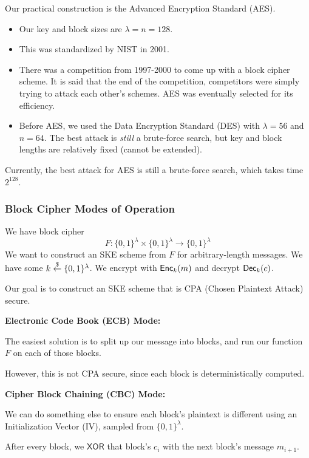 Our practical construction is the Advanced Encryption Standard (AES).
\begin{itemize}
    \item Our key and block sizes are $\lambda = n = 128$.
    \item This was standardized by NIST in 2001.
    \item There was a competition from 1997-2000 to come up with a block cipher scheme. It is said that the end of the competition, competitors were simply trying to attack each other's schemes. AES was eventually selected for its efficiency.
    \item Before AES, we used the Data Encryption Standard (DES) with $\lambda = 56$ and $n = 64$. The best attack is \emph{still} a brute-force search, but key and block lengths are relatively fixed (cannot be extended).
\end{itemize}

Currently, the best attack for AES is still a brute-force search, which takes time $2^{128}$.

\subsubsection{Block Cipher Modes of Operation}
We have block cipher
\[F : \{0, 1\}^\lambda\times \{0, 1\}^\lambda\to \{0, 1\}^\lambda\]
We want to construct an SKE scheme from $F$ for arbitrary-length messages. We have some $k\overset{\$}{\leftarrow}\{0, 1\}^\lambda$. We encrypt with $\operatorname{\mathsf{Enc}}_k(m)$ and decrypt $\operatorname{\mathsf{Dec}}_k(c)$.

Our goal is to construct an SKE scheme that is CPA (Chosen Plaintext Attack) secure.

\textbf{Electronic Code Book (ECB) Mode:}

The easiest solution is to split up our message into blocks, and run our function $F$ on each of those blocks.


However, this is not CPA secure, since each block is deterministically computed.

\textbf{Cipher Block Chaining (CBC) Mode:}

We can do something else to ensure each block's plaintext is different using an Initialization Vector (IV), sampled from $\{0, 1\}^\lambda$.

After every block, we $\mathsf{XOR}$ that block's $c_i$ with the next block's message $m_{i+1}$.


